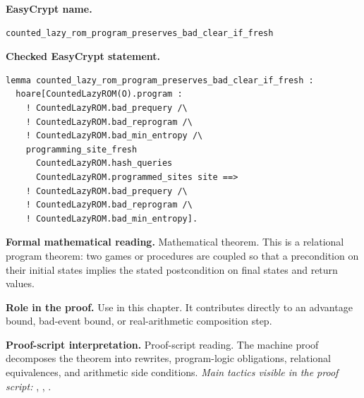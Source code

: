 \begin{formaltheorem}
\noindent\textbf{EasyCrypt name.}
\begin{lstlisting}[language=EasyCrypt,basicstyle=\ttfamily\scriptsize]
counted_lazy_rom_program_preserves_bad_clear_if_fresh
\end{lstlisting}
\noindent\textbf{Checked EasyCrypt statement.}
\begin{lstlisting}[language=EasyCrypt,basicstyle=\ttfamily\scriptsize]
lemma counted_lazy_rom_program_preserves_bad_clear_if_fresh :
  hoare[CountedLazyROM(O).program :
    ! CountedLazyROM.bad_prequery /\
    ! CountedLazyROM.bad_reprogram /\
    ! CountedLazyROM.bad_min_entropy /\
    programming_site_fresh
      CountedLazyROM.hash_queries
      CountedLazyROM.programmed_sites site ==>
    ! CountedLazyROM.bad_prequery /\
    ! CountedLazyROM.bad_reprogram /\
    ! CountedLazyROM.bad_min_entropy].
\end{lstlisting}
\noindent\textbf{Formal mathematical reading.}
Mathematical theorem. This is a relational program theorem: two games or procedures are coupled so that a precondition on their initial states implies the stated postcondition on final states and return values.

\noindent\textbf{Role in the proof.}
Use in this chapter. It contributes directly to an advantage bound, bad-event bound, or real-arithmetic composition step.

\noindent\textbf{Proof-script interpretation.}
Proof-script reading. The machine proof decomposes the theorem into rewrites, program-logic obligations, relational equivalences, and arithmetic side conditions.
\emph{Main tactics visible in the proof script:} , , .

\end{formaltheorem}

